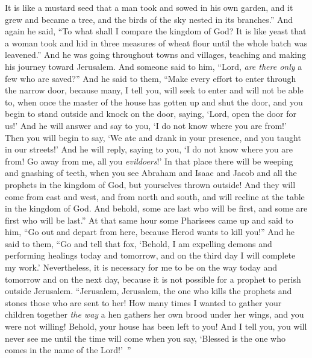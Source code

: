 \begin{biblechapter}
\verse It is like a mustard seed that a man took and sowed in his own garden, and it grew and became a tree, and the birds of the sky nested in its branches.”
 And again he said, “To what shall I compare the kingdom of God?
\verse It is like yeast that a woman took and hid in three measures of wheat flour until the whole batch was leavened.”
 And he was going throughout towns and villages, teaching and making his journey toward Jerusalem.
\verse And someone said to him, “Lord, \textit{are there only} a few who are saved?” And he said to them,
\verse “Make every effort to enter through the narrow door, because many, I tell you, will seek to enter and will not be able to,
\verse when once the master of the house has gotten up and shut the door, and you begin to stand outside and knock on the door, saying, ‘Lord, open the door for us!’ And he will answer and say to you, ‘I do not know where you are from!’
\verse Then you will begin to say, ‘We ate and drank in your presence, and you taught in our streets!’
\verse And he will reply, saying to you, ‘I do not know where you are from! Go away from me, all you \textit{evildoers}!’
\verse In that place there will be weeping and gnashing of teeth, when you see Abraham and Isaac and Jacob and all the prophets in the kingdom of God, but yourselves thrown outside!
\verse And they will come from east and west, and from north and south, and will recline at the table in the kingdom of God.
\verse And behold, some are last who will be first, and some are first who will be last.”
 At that same hour some Pharisees came up and said to him, “Go out and depart from here, because Herod wants to kill you!”
\verse And he said to them, “Go and tell that fox, ‘Behold, I am expelling demons and performing healings today and tomorrow, and on the third day I will complete my work.’
\verse Nevertheless, it is necessary for me to be on the way today and tomorrow and on the next day, because it is not possible for a prophet to perish outside Jerusalem.
\verse “Jerusalem, Jerusalem, the one who kills the prophets and stones those who are sent to her! How many times I wanted to gather your children together \textit{the way} a hen gathers her own brood under her wings, and you were not willing!
\verse Behold, your house has been left to you! And I tell you, you will never see me until the time will come when you say, ‘Blessed is the one who comes in the name of the Lord!’ ”
\end{biblechapter}

